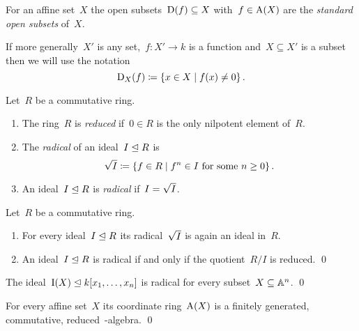 \begin{definition}
  For an affine set~$X$ the open subsets~$\operatorname{D}(f) \subseteq X$ with~$f \in \operatorname{A}(X)$ are the \emph{standard open subsets} of~$X$.
\end{definition}


\begin{notation}
  If more generally~$X'$ is any set,~$f \colon X' \to k$ is a function and~$X \subseteq X'$ is a subset then we will use the notation
  \[
              \Dopen_X(f)
    \defined  \{
                x \in X
              \suchthat
                f(x) \neq 0
              \} \,.
  \]
\end{notation}


\begin{definition}
  Let~$R$ be a commutative ring.
  \begin{enumerate}
    \item
      The ring~$R$ is \emph{reduced} if~$0 \in R$ is the only nilpotent element of~$R$.
    \item
      The \emph{radical} of an ideal~$I \trianglelefteq R$ is
      \[
                  \rad{I}
        \defined  \{
                    f \in R
                  \suchthat
                    \text{$f^n \in I$ for some~$n \geq 0$}
                  \} \,.
      \]
    \item
      An ideal~$I \trianglelefteq R$ is \emph{radical} if~$I = \sqrt{I}$.
  \end{enumerate}
\end{definition}


\begin{lemma}
  Let~$R$ be a commutative ring.
  \begin{enumerate}
    \item
      For every ideal~$I \trianglelefteq R$ its radical~$\sqrt{I}$ is again an ideal in~$R$.
    \item
      An ideal~$I \trianglelefteq R$ is radical if and only if the quotient~$R/I$ is reduced.
    \qed
  \end{enumerate}
\end{lemma}


\begin{lemma}
  The ideal~$\operatorname{I}(X) \trianglelefteq k[x_1, \dotsc, x_n]$ is radical for every subset~$X \subseteq \mathbb{A}^n$.
  \qed
\end{lemma}


\begin{corollary}
  \label{coordinate ring is fg commutative reduced}
  For every affine set~$X$ its coordinate ring~$\operatorname{A}(X)$ is a finitely generated, commutative, reduced~-algebra.
  \qed
\end{corollary}


